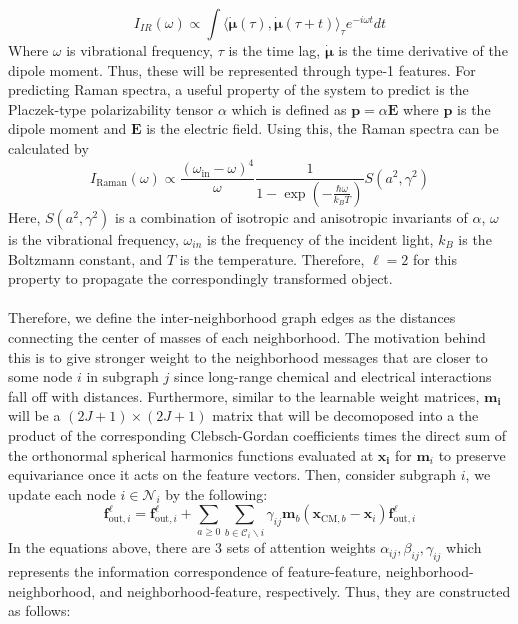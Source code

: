 \documentclass{article}
\begin{document}
\begin{equation}
    I_{IR}(\omega) \propto \int \langle \mathbf{\dot{\mu}}(\tau), \mathbf{\dot{\mu}}(\tau + t) \rangle_\tau e^{-i \omega t}dt
\end{equation}
Where $\omega$ is vibrational frequency, $\tau$ is the time lag, $\mathbf{\dot{\mu}}$ is the time derivative of the dipole moment. Thus, these will be represented through type-1 features. For predicting Raman spectra, a useful property of the system to predict is the Placzek-type polarizability tensor $\alpha$ which is defined as $\mathbf{p} = \alpha \mathbf{E}$ where $\mathbf{p}$ is the dipole moment and $\mathbf{E}$ is the electric field. Using this, the Raman spectra can be calculated by
\begin{equation}
    I_\text{Raman}(\omega) \propto \frac{(\omega_\text{in} - \omega)^4}{\omega} \frac{1}{1 - \exp(-\frac{\hbar \omega}{k_B T})}S(a^2, \gamma^2)
\end{equation}
Here, $S(a^2, \gamma^2)$ is a combination of isotropic and anisotropic invariants of $\alpha$, $\omega$ is the vibrational frequency, $\omega_{in}$ is the frequency of the incident light, $k_B$ is the Boltzmann constant, and $T$ is the temperature. Therefore, $\ell=2$ for this property to propagate the correspondingly transformed object. 
\\\\ 
 Therefore, we define the inter-neighborhood graph edges as the distances connecting the center of masses of each neighborhood. The motivation behind this is to give stronger weight to the neighborhood messages that are closer to some node $i$ in subgraph $j$ since long-range chemical and electrical interactions fall off with distances. Furthermore, similar to the learnable weight matrices, $\mathbf{m_i}$ will be a $(2J + 1) \times (2J + 1)$ matrix that will be decomoposed into a the product of the corresponding Clebsch-Gordan coefficients times the direct sum of the orthonormal spherical harmonics functions evaluated at $\mathbf{x_i}$ for $\mathbf{m}_i$ to preserve equivariance once it acts on the feature vectors. Then, consider subgraph $i$, we update each node $i \in \mathcal{N}_i$ by the following:
\begin{equation}
\mathbf{f}_{\text{out}, i}^\ell = \mathbf{f}_{\text{out}, i}^\ell + \sum_{a \geq 0} \sum_{b \in \mathcal{C}_i \backslash i} \gamma_{ij} \mathbf{m}_b(\mathbf{x}_{\text{CM},b} - \mathbf{x}_i)\mathbf{f}_{\text{out}, i}^\ell
\end{equation}
\noindent
In the equations above, there are 3 sets of attention weights $\alpha_{ij}, \beta_{ij}, \gamma_{ij}$ which represents the information correspondence of feature-feature, neighborhood-neighborhood, and neighborhood-feature, respectively. Thus, they are constructed as follows:
\end{document}
